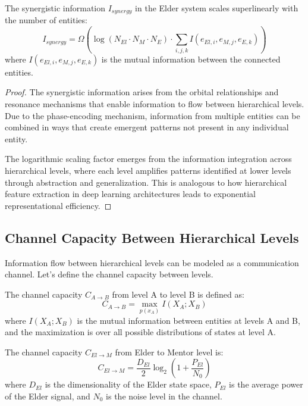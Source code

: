 \begin{theorem}
The synergistic information $I_{synergy}$ in the Elder system scales superlinearly with the number of entities:
\begin{equation}
I_{synergy} = \Omega\left(\log\left(N_{El} \cdot N_M \cdot N_E\right) \cdot \sum_{i,j,k} I(e_{El,i}, e_{M,j}, e_{E,k})\right)
\end{equation}
where $I(e_{El,i}, e_{M,j}, e_{E,k})$ is the mutual information between the connected entities.
\end{theorem}

\begin{proof}
The synergistic information arises from the orbital relationships and resonance mechanisms that enable information to flow between hierarchical levels. Due to the phase-encoding mechanism, information from multiple entities can be combined in ways that create emergent patterns not present in any individual entity. 

The logarithmic scaling factor emerges from the information integration across hierarchical levels, where each level amplifies patterns identified at lower levels through abstraction and generalization. This is analogous to how hierarchical feature extraction in deep learning architectures leads to exponential representational efficiency.
\end{proof}

\subsection{Channel Capacity Between Hierarchical Levels}

Information flow between hierarchical levels can be modeled as a communication channel. Let's define the channel capacity between levels.

\begin{definition}
The channel capacity $C_{A \to B}$ from level A to level B is defined as:
\begin{equation}
C_{A \to B} = \max_{p(x_A)} I(X_A; X_B)
\end{equation}
where $I(X_A; X_B)$ is the mutual information between entities at levels A and B, and the maximization is over all possible distributions of states at level A.
\end{definition}

\begin{theorem}
The channel capacity $C_{El \to M}$ from Elder to Mentor level is:
\begin{equation}
C_{El \to M} = \frac{D_{El}}{2} \log_2\left(1 + \frac{P_{El}}{N_0}\right)
\end{equation}
where $D_{El}$ is the dimensionality of the Elder state space, $P_{El}$ is the average power of the Elder signal, and $N_0$ is the noise level in the channel.
\end{theorem}

